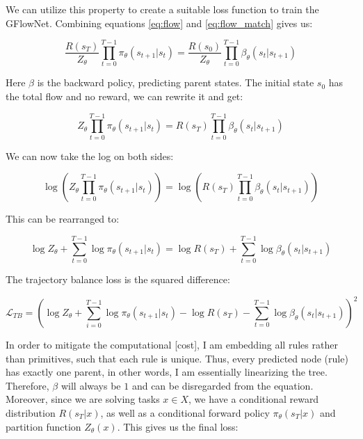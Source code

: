 We can utilize this property to create a suitable loss function to train the GFlowNet. Combining equations \ref{eq:flow} and \ref{eq:flow_match} gives us:

\begin{equation}
    \frac{R(s_T)}{Z_\theta} \prod_{t=0}^{T-1} \pi_\theta(s_{t+1} | s_{t}) = \frac{R(s_0)}{Z_\theta} \prod_{t=0}^{T-1} \beta_\theta(s_{t} | s_{t+1})
\end{equation}

Here \( \beta \) is the backward policy, predicting parent states. 
The initial state \(s_0\) has the total flow and no reward, we can rewrite it and get:

\begin{equation}
    Z_{\theta} \prod_{t=0}^{T-1} \pi_\theta(s_{t+1} | s_{t}) = R(s_T) \prod_{t=0}^{T-1} \beta_\theta(s_{t} | s_{t+1})
\end{equation}

We can now take the log on both sides:

\begin{equation}
    \log \left(Z_{\theta} \prod_{t=0}^{T-1} \pi_\theta(s_{t+1} | s_{t})\right) = \log \left(R(s_T) \prod_{t=0}^{T-1} \beta_\theta(s_{t} | s_{t+1})\right)
\end{equation}


This can be rearranged to:

\begin{equation}
    \log Z_\theta + \sum_{t=0}^{T-1} \log \pi_\theta(s_{t+1}|s_{t}) = \log R(s_T) + \sum_{t=0}^{T-1} \log \beta_\theta(s_{t}|s_{t+1})
\end{equation}

The trajectory balance loss is the squared difference:

\begin{equation}
    \mathcal{L}_{TB} = \left(\log Z_\theta + \sum_{i=0}^{T-1} \log \pi_\theta(s_{t+1}|s_{t}) - \log R(s_T) - \sum_{t=0}^{T-1} \log \beta_\theta(s_{t}|s_{t+1})\right)^2
\end{equation}


In order to mitigate the computational [cost], I am embedding all rules rather than primitives, such that each rule is unique. Thus, every predicted node (rule) has exactly one parent, in other words, I am essentially linearizing the tree. Therefore, $\beta$ will always be $1$ and can be disregarded from the equation. 
Moreover, since we are solving tasks \( x \in X \), we have a conditional reward distribution $R(s_T|x)$, as well as a conditional forward policy $\pi_\theta(s_T|x)$ and partition function $Z_\theta(x)$.
This gives us the final loss:

